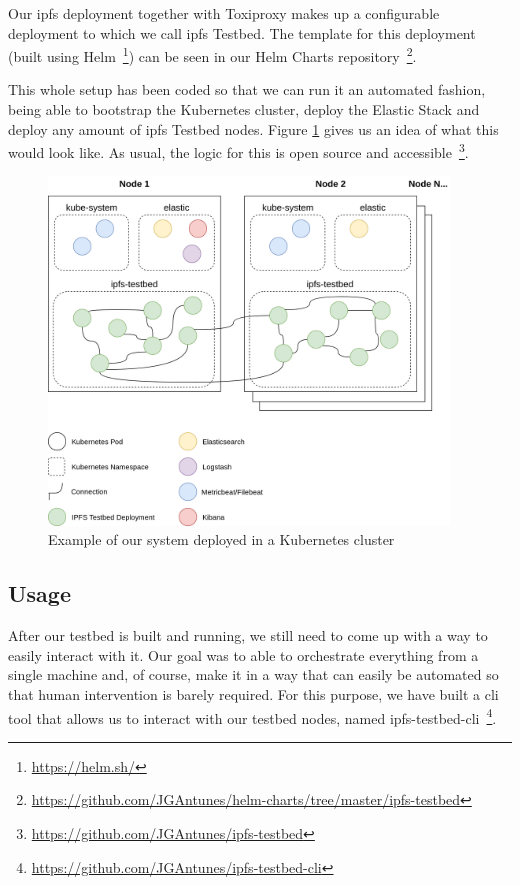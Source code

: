 Our \acrshort{ipfs} deployment together with Toxiproxy makes up a configurable deployment
to which we call \acrshort{ipfs} Testbed. The template for this deployment (built using
Helm~\footnote{\url{https://helm.sh/}}) can be seen in our Helm Charts
repository~\footnote{\url{https://github.com/JGAntunes/helm-charts/tree/master/ipfs-testbed}}.

This whole setup has been coded so that we can run it an automated fashion,
being able to bootstrap the Kubernetes cluster, deploy the Elastic Stack and
deploy any amount of \acrshort{ipfs} Testbed nodes. Figure
\ref{fig:ipfs-testbed-kubernetes-overview} gives us an idea of what this would
look like. As usual, the logic for this is open source and
accessible~\footnote{\url{https://github.com/JGAntunes/ipfs-testbed}}.

\begin{figure}[!htb]
  \centering
  \includegraphics[width=0.95\textwidth]{img/ipfs-testbed-kubernetes-overview.png}
  \caption{Example of our system deployed in a Kubernetes cluster}
  \label{fig:ipfs-testbed-kubernetes-overview}
\end{figure}

\subsection{Usage}\label{subsec:testbed-usage}

After our testbed is built and running, we still need to come up with a way to
easily interact with it. Our goal was to able to orchestrate everything from a
single machine and, of course, make it in a way that can easily be automated so
that human intervention is barely required. For this purpose, we have built a
\acrshort{cli} tool that allows us to interact with our testbed nodes, named
ipfs-testbed-cli~\footnote{\url{https://github.com/JGAntunes/ipfs-testbed-cli}}. 

